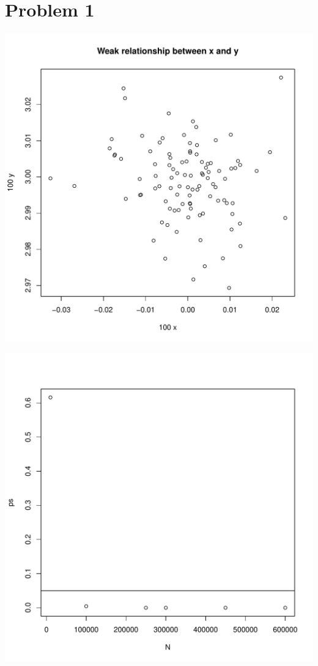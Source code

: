 \documentclass{article}\usepackage[]{graphicx}\usepackage[]{color}
\newenvironment{knitrout}{}{} %
\begin{document}
\section*{Problem 1}

\begin{knitrout}
\color{fgcolor}
\includegraphics[width=5.5in]{figure/p1-1} 

\includegraphics[width=5.5in]{figure/p1-2} 

\end{knitrout}
\end{document}
